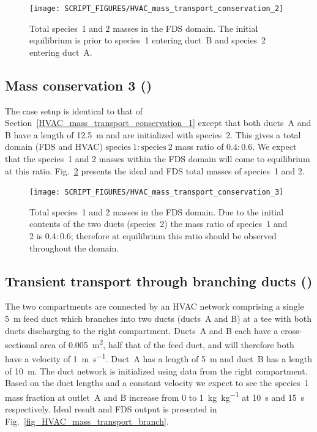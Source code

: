 \documentclass[11pt]{book}
\begin{document}
\begin{figure}[ht]
\centering
\texttt{[image: SCRIPT\_FIGURES/HVAC\_mass\_transport\_conservation\_2]}
\caption[ test case.]{Total species~1 and 2 masses in the FDS domain. The initial equilibrium is prior to species~1 entering duct~B and species~2 entering duct~A.}
\label{fig_HVAC_mass_transport_conservation_2}
\end{figure}

\subsection{Mass conservation 3 (\texorpdfstring{}{HVAC\_mass\_transport\_conservation\_3})}
\label{HVAC_mass_transport_conservation_3}
The case setup is identical to that of Section~\ref{HVAC_mass_transport_conservation_1} except that both ducts~A and B have a length of \SI{12.5}{\meter} and are initialized with species~2. This gives a total domain (FDS and HVAC) \(\text{species}\ 1 \colon \text{species}\ 2\) mass ratio of \(0.4 \colon 0.6\). We expect that the species~1 and 2 masses within the FDS domain will come to equilibrium at this ratio. Fig.~\ref{fig_HVAC_mass_transport_conservation_3} presents the ideal and FDS total masses of species~1 and 2.

\begin{figure}[ht]
\centering
\texttt{[image: SCRIPT\_FIGURES/HVAC\_mass\_transport\_conservation\_3]}
\caption[ test case.]{Total species~1 and 2 masses in the FDS domain. Due to the initial contents of the two ducts (species~2) the mass ratio of species~1 and 2 is \(0.4 \colon 0.6\); therefore at equilibrium this ratio should be observed throughout the domain.}
\label{fig_HVAC_mass_transport_conservation_3}
\end{figure}

\subsection{Transient transport through branching ducts (\texorpdfstring{}{HVAC\_mass\_transport\_branch})}
\label{HVAC_mass_transport_branch}
The two compartments are connected by an HVAC network comprising a single \SI{5}{\meter} feed duct which branches into two ducts (ducts~A and B) at a tee with both ducts discharging to the right compartment. Ducts~A and B each have a cross-sectional area of \SI{0.005}{\meter\squared}, half that of the feed duct, and will therefore both have a velocity of \SI[per-mode=symbol]{1}{\meter\per\second}. Duct~A has a length of \SI{5}{\meter} and duct~B has a length of \SI{10}{\meter}. The duct network is initialized using data from the right compartment. Based on the duct lengths and a constant velocity we expect to see the species~\num{1} mass fraction at outlet~A and B increase from \num{0} to \SI[per-mode=symbol]{1}{\kilogram\per\kilogram} at \SI{10}{\second} and \SI{15}{\second} respectively. Ideal result and FDS output is presented in Fig.~\ref{fig_HVAC_mass_transport_branch}.
\end{document}
